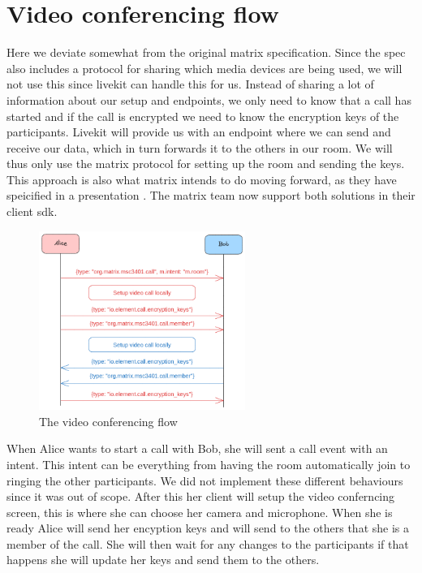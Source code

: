 \documentclass{report}
\begin{document}
    \section{Video conferencing flow}
    Here we deviate somewhat from the original matrix specification. Since the spec also includes a protocol for
    sharing which media devices are being used, we will not use this since livekit can handle this for us. Instead
    of sharing a lot of information about our setup and endpoints, we only need to know that a call has started and
    if the call is encrypted we need to know the encryption keys of the participants. Livekit will provide us with
    an endpoint where we can send and receive our data, which in turn forwards it to the others in our room. We
    will thus only use the matrix protocol for setting up the room and sending the keys. This approach is also what
    matrix intends to do moving forward, as they have speicified in a presentation . The
    matrix team now support both solutions in their client sdk.

    \begin{figure}
        \centering
        \includegraphics[width=0.6\textwidth]{img/Callflow.excalidraw.png}
        \caption{The video conferencing flow}
        \label{fig:video-conference-flow}
    \end{figure}

    When Alice wants to start a call with Bob, she will sent a call event with an intent. This intent can be
    everything from having the room automatically join to ringing the other participants. We did not implement
    these different behaviours since it was out of scope. After this her client will setup the video conferncing
    screen, this is where she can choose her camera and microphone. When she is ready Alice will send her encyption
    keys and will send to the others that she is a member of the call. She will then wait for any changes to the participants
    if that happens she will update her keys and send them to the others.
\end{document}
